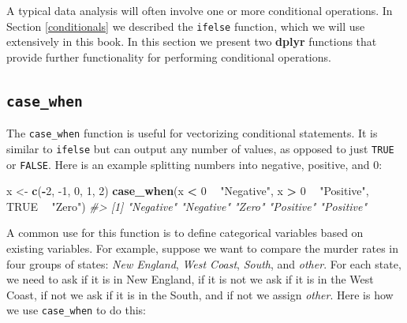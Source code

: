 \documentclass[
]{krantz}
\newenvironment{Shaded}{\begin{snugshade}}{\end{snugshade}}
\newcommand{\CommentTok}[1]{\textcolor[rgb]{0.37,0.37,0.37}{\textit{#1}}}
\newcommand{\DecValTok}[1]{\textcolor[rgb]{0.06,0.06,0.06}{#1}}
\newcommand{\KeywordTok}[1]{\textcolor[rgb]{0.27,0.27,0.27}{\textbf{#1}}}
\newcommand{\NormalTok}[1]{#1}
\newcommand{\OperatorTok}[1]{\textcolor[rgb]{0.43,0.43,0.43}{\textbf{#1}}}
\newcommand{\OtherTok}[1]{\textcolor[rgb]{0.37,0.37,0.37}{#1}}
\newcommand{\StringTok}[1]{\textcolor[rgb]{0.5,0.5,0.5}{#1}}
\begin{document}
A typical data analysis will often involve one or more conditional operations. In Section \ref{conditionals} we described the \texttt{ifelse} function, which we will use extensively in this book. In this section we present two \textbf{dplyr} functions that provide further functionality for performing conditional operations.

\hypertarget{case_when}{%
\subsection{\texorpdfstring{\texttt{case\_when}}{case\_when}}\label{case_when}}

The \texttt{case\_when} function is useful for vectorizing conditional statements. It is similar to \texttt{ifelse} but can output any number of values, as opposed to just \texttt{TRUE} or \texttt{FALSE}. Here is an example splitting numbers into negative, positive, and 0:

\begin{Shaded}
\begin{Highlighting}[]
\NormalTok{x <-}\StringTok{ }\KeywordTok{c}\NormalTok{(}\OperatorTok{-}\DecValTok{2}\NormalTok{, }\DecValTok{-1}\NormalTok{, }\DecValTok{0}\NormalTok{, }\DecValTok{1}\NormalTok{, }\DecValTok{2}\NormalTok{)}
\KeywordTok{case_when}\NormalTok{(x }\OperatorTok{<}\StringTok{ }\DecValTok{0} \OperatorTok{~}\StringTok{ "Negative"}\NormalTok{, }
\NormalTok{          x }\OperatorTok{>}\StringTok{ }\DecValTok{0} \OperatorTok{~}\StringTok{ "Positive"}\NormalTok{, }
          \OtherTok{TRUE}  \OperatorTok{~}\StringTok{ "Zero"}\NormalTok{)}
\CommentTok{#> [1] "Negative" "Negative" "Zero"     "Positive" "Positive"}
\end{Highlighting}
\end{Shaded}

A common use for this function is to define categorical variables based on existing variables. For example, suppose we want to compare the murder rates in four groups of states: \emph{New England}, \emph{West Coast}, \emph{South}, and \emph{other}. For each state, we need to ask if it is in New England, if it is not we ask if it is in the West Coast, if not we ask if it is in the South, and if not we assign \emph{other}. Here is how we use \texttt{case\_when} to do this:
\end{document}
